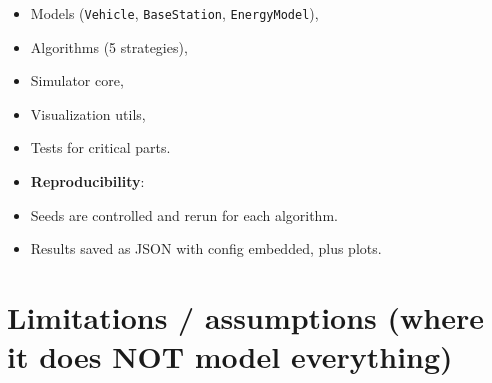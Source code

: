 \documentclass[conference]{IEEEtran}
\begin{document}
\begin{itemize}
\item Models (\texttt{Vehicle}, \texttt{BaseStation}, \texttt{EnergyModel}),
\item Algorithms (5 strategies),
\item Simulator core,
\item Visualization utils,
\item Tests for critical parts.
\item \textbf{Reproducibility}:
\item Seeds are controlled and rerun for each algorithm.
\item Results saved as JSON with config embedded, plus plots.
\end{itemize}



\section{Limitations / assumptions (where it does NOT model everything)}
\end{document}
